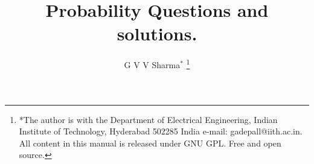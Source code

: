 \documentclass[journal,12pt,twocolumn]{IEEEtran}
\begin{document}
\let\StandardTheFigure\thefigure
\let\vec\mathbf
\renewcommand{\thefigure}{\theproblem}



\def\putbox#1#2#3{\makebox[0in][l]{\makebox[#1][l]{}\raisebox{\baselineskip}[0in][0in]{\raisebox{#2}[0in][0in]{#3}}}}
     \def\rightbox#1{\makebox[0in][r]{#1}}
     \def\centbox#1{\makebox[0in]{#1}}
     \def\topbox#1{\raisebox{-\baselineskip}[0in][0in]{#1}}
     \def\midbox#1{\raisebox{-0.5\baselineskip}[0in][0in]{#1}}

\vspace{3cm}

\title{
Probability Questions and solutions.
}
\author{ G V V Sharma$^{*}$%
	\thanks{*The author is with the Department
		of Electrical Engineering, Indian Institute of Technology, Hyderabad
		502285 India e-mail:  gadepall@iith.ac.in. All content in this manual is released under GNU GPL.  Free and open source.}
	
}	


%
%
%

% 
%
\end{document}
